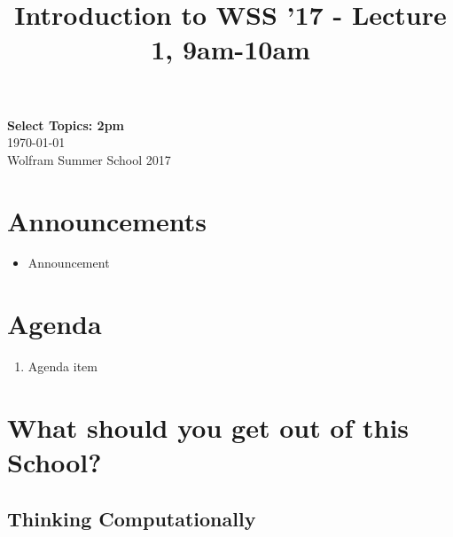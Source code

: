 \documentclass[11pt]{article}
\theoremstyle{definition}
\begin{document}
\title{Introduction to WSS '17 - Lecture 1, 9am-10am}

\thispagestyle{empty}
\begin{center}
{\LARGE \bf Select Topics: 2pm}\\
\medskip
{\Large \today}\\
\smallskip
{\large Wolfram Summer School 2017}
\end{center}

\section*{Announcements}
\begin{itemize}
\item Announcement
\end{itemize}

\noindent\hrulefill



\section*{Agenda}
\begin{enumerate}
\item Agenda item
\end{enumerate}

\noindent\hrulefill




\section{What should you get out of this School?}

\subsection{Thinking Computationally}
\end{document}
